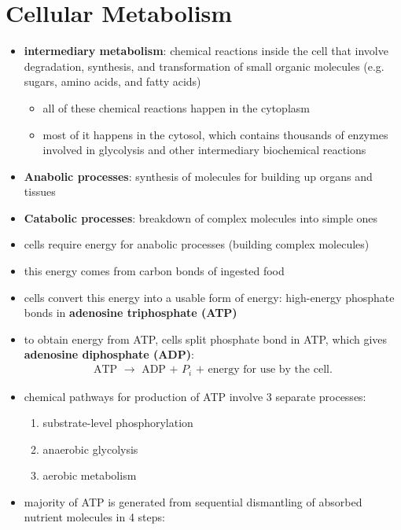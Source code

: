 \documentclass[10pt]{article}
\begin{document}
\section{Cellular Metabolism}
\begin{itemize}
    \item \textbf{intermediary metabolism}: chemical reactions inside the cell that involve degradation, synthesis, and transformation of small organic molecules (e.g. sugars, amino acids, and fatty acids)
        \begin{itemize}
            \item all of these chemical reactions happen in the cytoplasm
            \item most of it happens in the cytosol, which contains thousands of enzymes involved in glycolysis and other intermediary biochemical reactions
        \end{itemize}
    \item \textbf{Anabolic processes}: synthesis of molecules for building up organs and tissues
    \item \textbf{Catabolic processes}: breakdown of complex molecules into simple ones
    \item cells require energy for anabolic processes (building complex molecules)
    \item this energy comes from carbon bonds of ingested food
    \item cells convert this energy into a usable form of energy: high-energy phosphate bonds in \textbf{adenosine triphosphate (ATP)}
    \item to obtain energy from ATP, cells split phosphate bond in ATP, which gives \textbf{adenosine diphosphate (ADP)}:
        \begin{align*}
            \text{ATP $\to$ ADP + $P_i$ + energy for use by the cell}
        .\end{align*}
    \item chemical pathways for production of ATP involve 3 separate processes:
        \begin{enumerate}
            \item substrate-level phosphorylation
            \item anaerobic glycolysis
            \item aerobic metabolism
        \end{enumerate}
    \item majority of ATP is generated from sequential dismantling of absorbed nutrient molecules in 4 steps:
        \begin{enumerate}

\end{enumerate}
\end{itemize}
\end{document}
